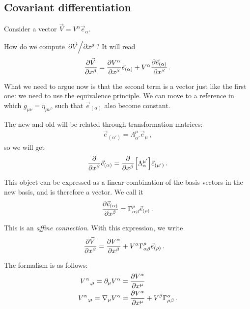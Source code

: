\documentclass[main.tex]{subfiles}
\begin{document}
\subsection{Covariant differentiation}


Consider a vector \(\vec{V} = V^{\alpha } \vec{e}_\alpha \). 

How do we compute \(\pdv*{\vec{V}}{x^{\mu }}\)? It will read 
%
\begin{align}
\pdv{\vec{V}}{x^{\beta }} = \pdv{V^{\alpha }}{x^{\beta }} \vec{e}_{(\alpha )} + V^{\alpha } \pdv{\vec{e}_{(\alpha )}}{x^{\beta }} 
\,.
\end{align}

What we need to argue now is that the second term is a vector just like the first one: 
we need to use the equivalence principle. 
We can move to a reference in which \(g_{\mu \nu } = \eta_{\mu \nu }\),
such that \(\vec{e}_{(\alpha )}\) also become constant. 

The new and old will be related through transformation matrices: 
%
\begin{align}
\vec{e}_{(\alpha ')} = \Lambda^{\mu }_{\alpha'} \vec{e}_{\mu }
\,,
\end{align}
%
so we will get 
%
\begin{align}
\pdv{}{x^{\beta }} \vec{e}_{(\alpha )} = \pdv{}{x^{\beta }} \qty[ \Lambda^{\mu '}_\alpha ] \vec{e}_{(\mu ')} 
\,.
\end{align}

This object can be expressed as a linear combination of the 
basis vectors in the new basis, and is therefore a vector. 
We call it 
%
\begin{align}
\pdv{\vec{e}_{(\alpha )}}{x^{\beta} } = \Gamma^{\rho }_{\alpha \beta } \vec{e}_{(\rho )}
\,.
\end{align}

This is an \emph{affine connection}.
With this expression, we write 
%
\begin{align}
\pdv{\vec{V}}{x^{\beta }} &= \pdv{V^{\alpha }}{x^{\beta }} + V^{\alpha } \Gamma^{\rho }_{\alpha \beta } \vec{e}_{(\rho )} 
\,.
\end{align}

The formalism is as follows: 
%
\begin{align}
V^{\alpha }{}_{, \mu } = \partial_{\mu } V^{\alpha } &= \pdv{V^{\alpha }}{x^{\mu }} \\
V^{\alpha }{}_{; \mu } = \nabla_\mu V^{\alpha } &= \pdv{V^{\alpha }}{x^{\mu }} + V^{\beta } \Gamma^{\alpha }_{\mu \beta }
\,.
\end{align}
\end{document}
